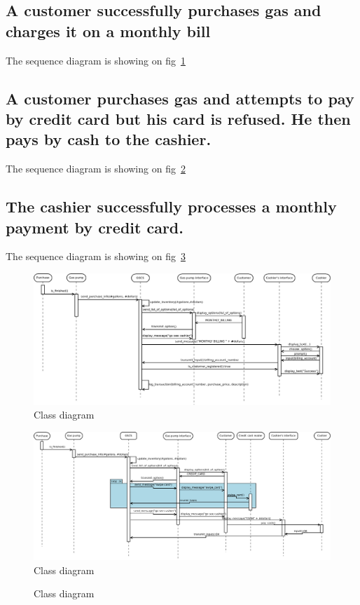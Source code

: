 


\subsection{A customer successfully purchases gas and charges it on
a monthly bill}

The sequence diagram is showing on fig~\ref{fig:seq-diagram1}

\subsection{A customer purchases gas and attempts to pay by credit
card but his card is refused. He then pays by cash to the cashier.}

The sequence diagram is showing on fig~\ref{fig:seq-diagram2}

\subsection{The cashier successfully processes a monthly payment by
credit card.}

The sequence diagram is showing on fig~\ref{fig:seq-diagram3}


\begin{landscape}
\begin{figure}[!h]
\centering
\includegraphics[width=\linewidth]{drafts/sequence_1.png}
\caption{Class diagram}
\label{fig:seq-diagram1}
\end{figure}
\end{landscape}

\begin{landscape}
\begin{figure}[!h]
\centering
\includegraphics[width=\linewidth]{drafts/sequence_2.png}
\caption{Class diagram}
\label{fig:seq-diagram2}
\end{figure}
\end{landscape}

\begin{landscape}
\begin{figure}[!h]
\centering
\caption{Class diagram}
\label{fig:seq-diagram3}
\end{figure}
\end{landscape}

